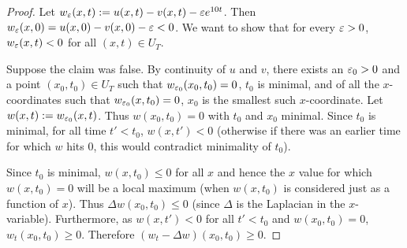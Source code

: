 \begin{proof}
Let $w_{\varepsilon}(x, t) := u(x, t) - v(x, t) - \varepsilon e^{10t}$.
Then $w_{\varepsilon}(x, 0) = u(x, 0) - v(x, 0) - \varepsilon < 0$.
We want to show that for every $\varepsilon > 0$, $w_{\varepsilon}(x, t) < 0$ for all $(x, t) \in U_{T}$.

Suppose the claim was false.
By continuity of $u$ and $v$,
there exists an $\varepsilon_{0} > 0$ and a point $(x_{0}, t_{0}) \in U_{T}$ such that
$w_{\varepsilon_{0}}(x_{0}, t_{0}) = 0$, $t_{0}$ is minimal, and of all the $x$-coordinates such that $w_{\varepsilon_{0}}(x, t_{0}) = 0$, $x_{0}$ is the smallest such $x$-coordinate.
Let $w(x, t) := w_{\varepsilon_{0}}(x, t)$. Thus $w(x_{0}, t_{0}) = 0$ with $t_{0}$ and $x_{0}$ minimal.
Since $t_{0}$ is minimal, for all time $t' < t_{0}$, $w(x, t') < 0$ (otherwise if there was an earlier time for which $w$ hits 0, this would contradict
minimality of $t_{0}$).

Since $t_{0}$ is minimal, $w(x, t_{0}) \leq 0$ for all $x$ and hence the $x$ value for
which $w(x, t_{0}) = 0$ will be a local maximum (when $w(x, t_{0})$ is considered just as a function of $x$). Thus $\Delta w(x_{0}, t_{0}) \leq 0$ (since $\Delta$ is the Laplacian in the $x$-variable).
Furthermore, as $w(x, t') < 0$ for all $t' < t_{0}$ and $w(x_{0}, t_{0}) = 0$,
$w_{t}(x_{0}, t_{0}) \geq 0$. Therefore $(w_{t} - \Delta w)(x_{0}, t_{0}) \geq 0$.


\end{proof}
